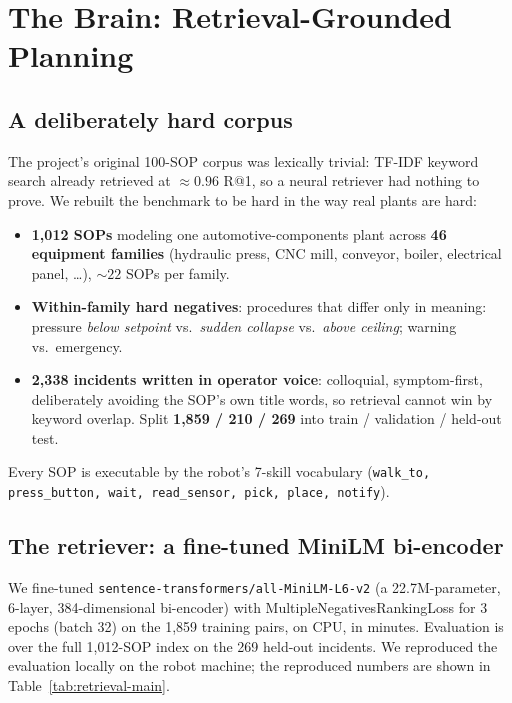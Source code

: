 \documentclass[11pt]{article}
\begin{document}
\section{The Brain: Retrieval-Grounded Planning}

\subsection{A deliberately hard corpus}

The project's original 100-SOP corpus was lexically trivial: TF-IDF keyword search already retrieved at ${\approx}0.96$ R@1, so a neural retriever had nothing to prove. We rebuilt the benchmark to be hard in the way real plants are hard:
\begin{itemize}[nosep]
  \item \textbf{1{,}012 SOPs} modeling one automotive-components plant across \textbf{46 equipment families} (hydraulic press, CNC mill, conveyor, boiler, electrical panel, \ldots), ${\sim}22$ SOPs per family.
  \item \textbf{Within-family hard negatives}: procedures that differ only in meaning: pressure \emph{below setpoint} vs.\ \emph{sudden collapse} vs.\ \emph{above ceiling}; warning vs.\ emergency.
  \item \textbf{2{,}338 incidents written in operator voice}: colloquial, symptom-first, deliberately avoiding the SOP's own title words, so retrieval cannot win by keyword overlap. Split \textbf{1{,}859 / 210 / 269} into train / validation / held-out test.
\end{itemize}
Every SOP is executable by the robot's 7-skill vocabulary (\texttt{walk\_to, press\_button, wait, read\_sensor, pick, place, notify}).

\subsection{The retriever: a fine-tuned MiniLM bi-encoder}

We fine-tuned \texttt{sentence-transformers/all-MiniLM-L6-v2} (a 22.7M-parameter, 6-layer, 384-dimensional bi-encoder) with MultipleNegativesRankingLoss \cite{sbert,minilm} for 3 epochs (batch 32) on the 1{,}859 training pairs, on CPU, in minutes. Evaluation is over the full 1{,}012-SOP index on the 269 held-out incidents. We reproduced the evaluation locally on the robot machine; the reproduced numbers are shown in Table~\ref{tab:retrieval-main}.
\end{document}
